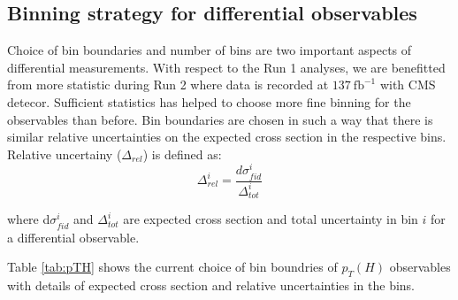 \subsection{Binning strategy for differential observables}
Choice of bin boundaries and number of bins are two important aspects of differential measurements. 
With respect to the Run 1 analyses, we are benefitted from more statistic during Run 2 where data is recorded at $137~\mathrm{fb}^{-1}$ with CMS detecor.
Sufficient statistics has helped to choose more fine binning for the observables than before. 
Bin boundaries are chosen in such a way that there is similar relative uncertainties on the expected cross section in the respective bins. Relative uncertainy ($\Delta_{rel}$) is defined as:
\begin{equation} \label{eq:rel_unc}
	\Delta^{i}_{rel} = \frac{d\sigma^{i}_{fid}}{\Delta^{i}_{tot}}%
\end{equation}

where d$\sigma^{i}_{fid}$ and $\Delta^{i}_{tot}$ are expected cross section and total uncertainty in bin $i$ for a differential observable. 

Table \ref{tab:pTH} shows the current choice of bin boundries of $p_{T}(H)$ observables with details of expected cross section and relative uncertainties in the bins. 

